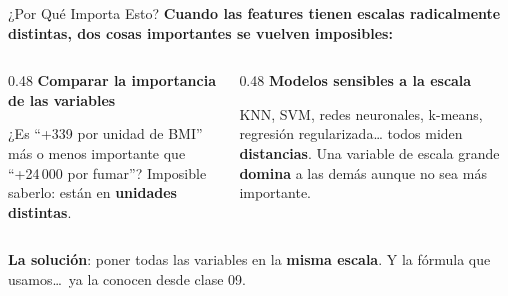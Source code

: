 \documentclass[aspectratio=169, 11pt]{beamer}
\begin{document}
\begin{frame}{¿Por Qué Importa Esto?}
  \vspace{-4pt}
  {\footnotesize\color{arcaDark}\bfseries
    Cuando las features tienen escalas radicalmente distintas, dos cosas
    importantes se vuelven imposibles:}

  \vspace{8pt}
  \begin{columns}[T]
    \begin{column}{0.48\textwidth}
      {\footnotesize\bfseries\color{arcaRed}
        \faTimesCircle\hspace{4pt} Comparar la importancia
        de las variables}
      \vspace{4pt}

      {\scriptsize
      ¿Es ``+339 por unidad de BMI'' más o menos importante que
      ``+24\,000 por fumar''? Imposible saberlo: están en
      \textbf{unidades distintas}.}
    \end{column}

    \begin{column}{0.48\textwidth}
      {\footnotesize\bfseries\color{arcaRed}
        \faTimesCircle\hspace{4pt} Modelos sensibles a la escala}
      \vspace{4pt}

      {\scriptsize
      KNN, SVM, redes neuronales, k-means, regresión regularizada\dots
      todos miden \textbf{distancias}. Una variable de escala grande
      \textbf{domina} a las demás aunque no sea más importante.}
    \end{column}
  \end{columns}

  \vspace{8pt}
  {\footnotesize\color{arcaDark}
    \faLightbulb\hspace{4pt}
    \textbf{La solución}: poner todas las variables en la \textbf{misma
    escala}. Y la fórmula que usamos\dots\ ya la conocen desde clase 09.}
\end{frame}
\end{document}
